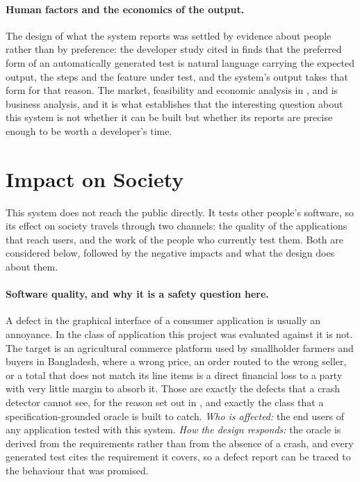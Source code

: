 \paragraph{Human factors and the economics of the output.} The design of what
the system reports was settled by evidence about people rather than by
preference: the developer study cited in  finds that the
preferred form of an automatically generated test is natural language carrying
the expected output, the steps and the feature under test, and the system's
output takes that form for that reason. The market, feasibility and economic
analysis in ,  and 
is business analysis, and it is what establishes that the interesting question
about this system is not whether it can be built but whether its reports are
precise enough to be worth a developer's time.


\section{Impact on Society}
\label{sec:society}

This system does not reach the public directly. It tests other people's
software, so its effect on society travels through two channels: the quality of
the applications that reach users, and the work of the people who currently
test them. Both are considered below, followed by the negative impacts and what
the design does about them.

\paragraph{Software quality, and why it is a safety question here.} A defect in
the graphical interface of a consumer application is usually an annoyance. In
the class of application this project was evaluated against it is not. The
target is an agricultural commerce platform used by smallholder farmers and
buyers in Bangladesh, where a wrong price, an order routed to the wrong seller,
or a total that does not match its line items is a direct financial loss to a
party with very little margin to absorb it. Those are exactly the defects that
a crash detector cannot see, for the reason set out in
, and exactly the class that a specification-grounded
oracle is built to catch. \emph{Who is affected:} the end users of any
application tested with this system. \emph{How the design responds:} the oracle
is derived from the requirements rather than from the absence of a crash, and
every generated test cites the requirement it covers, so a defect report can be
traced to the behaviour that was promised.

